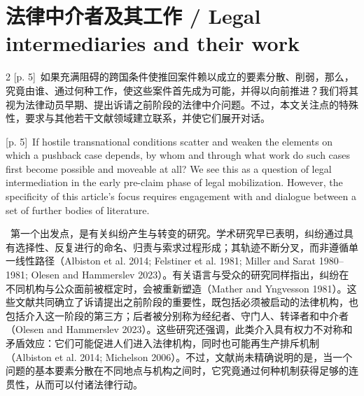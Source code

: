 \documentclass[10pt,a4paper]{article}
\begin{document}
\section*{法律中介者及其工作 / Legal intermediaries and their work}
\begin{paracol}{2}
{\scriptsize\color{gray} [p. 5]}\ 如果充满阻碍的跨国条件使推回案件赖以成立的要素分散、削弱，那么，究竟由谁、通过何种工作，使这些案件首先成为可能，并得以向前推进？我们将其视为法律动员早期、提出诉请之前阶段的法律中介问题。不过，本文关注点的特殊性，要求与其他若干文献领域建立联系，并使它们展开对话。\par
\switchcolumn
{\scriptsize\color{gray} [p. 5]}\ If hostile transnational conditions scatter and weaken the elements on which a pushback case depends, by whom and through what work do such cases first become possible and moveable at all? We see this as a question of legal intermediation in the early pre-claim phase of legal mobilization. However, the specificity of this article’s focus requires engagement with and dialogue between a set of further bodies of literature.\par
\switchcolumn*
{\scriptsize\color{gray} [p. 5]}\ 第一个出发点，是有关纠纷产生与转变的研究。学术研究早已表明，纠纷通过具有选择性、反复进行的命名、归责与索求过程形成；其轨迹不断分叉，而非遵循单一线性路径（Albiston et al. 2014; Felstiner et al. 1981; Miller and Sarat 1980–1981; Olesen and Hammerslev 2023）。有关语言与受众的研究同样指出，纠纷在不同机构与公众面前被框定时，会被重新塑造（Mather and Yngvesson 1981）。这些文献共同确立了诉请提出之前阶段的重要性，既包括必须被启动的法律机构，也包括介入这一阶段的第三方；后者被分别称为经纪者、守门人、转译者和中介者（Olesen and Hammerslev 2023）。这些研究还强调，此类介入具有权力不对称和矛盾效应：它们可能促进人们进入法律机构，同时也可能再生产排斥机制（Albiston et al. 2014; Michelson 2006）。不过，文献尚未精确说明的是，当一个问题的基本要素分散在不同地点与机构之间时，它究竟通过何种机制获得足够的连贯性，从而可以付诸法律行动。\par
\switchcolumn

\end{paracol}
\end{document}
